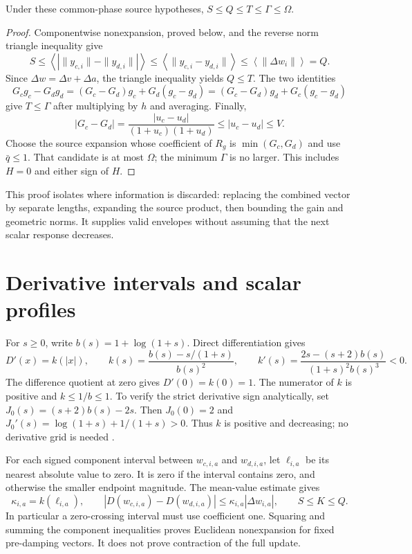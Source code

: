 \documentclass[11pt,a4paper]{article}
\newcommand{\avg}[1]{\left\langle #1\right\rangle}
\begin{document}
\begin{proposition}\label{thm:chain}
Under these common-phase source hypotheses, $S\le Q\le T\le\Gamma\le\Omega$.
\end{proposition}
\begin{proof}
Componentwise nonexpansion, proved below, and the reverse norm triangle inequality give
\[
S\le\avg{|\|y_{c,i}\|-\|y_{d,i}\||}
\le\avg{\|y_{c,i}-y_{d,i}\|}\le\avg{\|\Delta w_i\|}=Q.
\]
Since $\Delta w=\Delta v+\Delta a$, the triangle inequality yields $Q\le T$.
The two identities
\[
G_cg_c-G_dg_d=(G_c-G_d)g_c+G_d(g_c-g_d)
=(G_c-G_d)g_d+G_c(g_c-g_d)
\]
give $T\le\Gamma$ after multiplying by $h$ and averaging. Finally,
\[
|G_c-G_d|=\frac{|u_c-u_d|}{(1+u_c)(1+u_d)}\le |u_c-u_d|\le V.
\]
Choose the source expansion whose coefficient of $R_g$ is $\min(G_c,G_d)$ and use $\bar q\le1$. That candidate is at most $\Omega$; the minimum $\Gamma$ is no larger. This includes $H=0$ and either sign of $H$.
\end{proof}
This proof isolates where information is discarded: replacing the combined vector by separate lengths, expanding the source product, then bounding the gain and geometric norms. It supplies valid envelopes without assuming that the next scalar response decreases.

\clearpage
\section{Derivative intervals and scalar profiles}\label{sec:derivative}
For $s\ge0$, write $b(s)=1+\log(1+s)$. Direct differentiation gives
\begin{equation}\label{eq:k}
D'(x)=k(|x|),\qquad k(s)=\frac{b(s)-s/(1+s)}{b(s)^2},\qquad
k'(s)=\frac{2s-(s+2)b(s)}{(1+s)^2b(s)^3}<0.
\end{equation}
The difference quotient at zero gives $D'(0)=k(0)=1$. The numerator of $k$ is positive and $k\le1/b\le1$. To verify the strict derivative sign analytically, set $J_0(s)=(s+2)b(s)-2s$. Then $J_0(0)=2$ and $J_0'(s)=\log(1+s)+1/(1+s)>0$. Thus $k$ is positive and decreasing; no derivative grid is needed \cite{math}.

For each signed component interval between $w_{c,i,a}$ and $w_{d,i,a}$, let $\ell_{i,a}$ be its nearest absolute value to zero. It is zero if the interval contains zero, and otherwise the smaller endpoint magnitude. The mean-value estimate gives
\begin{equation}\label{eq:K}
\kappa_{i,a}=k(\ell_{i,a}),\qquad
|D(w_{c,i,a})-D(w_{d,i,a})|\le\kappa_{i,a}|\Delta w_{i,a}|,
\qquad S\le K\le Q.
\end{equation}
In particular a zero-crossing interval must use coefficient one. Squaring and summing the component inequalities proves Euclidean nonexpansion for fixed pre-damping vectors. It does not prove contraction of the full update.
\end{document}
